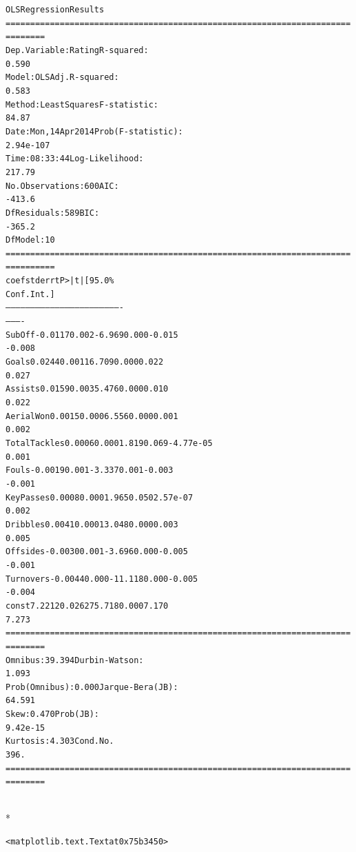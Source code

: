 \documentclass[letterpaper,10pt,english]{/usr/local/lib/python2.7/dist-packages/sphinx/texinputs/sphinxhowto}
\def\smaller{\fontsize{9.5pt}{9.5pt}\selectfont}
\newenvironment{InvisibleVerbatim}
        {\begin{mdframed}[leftmargin=0.1\linewidth,innerleftmargin=3pt,innerrightmargin=3pt, userdefinedwidth=1\linewidth, linewidth=0pt, linecolor=white, usetwoside=false]}
        {\end{mdframed}}
\begin{document}
                \begin{InvisibleVerbatim}
                \vspace{-0.5\baselineskip}
\begin{alltt}                            OLS Regression Results
======================================================================
========
Dep. Variable:                 Rating   R-squared:
0.590
Model:                            OLS   Adj. R-squared:
0.583
Method:                 Least Squares   F-statistic:
84.87
Date:                Mon, 14 Apr 2014   Prob (F-statistic):
2.94e-107
Time:                        08:33:44   Log-Likelihood:
217.79
No. Observations:                 600   AIC:
-413.6
Df Residuals:                     589   BIC:
-365.2
Df Model:                          10
======================================================================
==========
                   coef    std err          t      P>|t|      [95.0\%
Conf. Int.]
----------------------------------------------------------------------
----------
SubOff          -0.0117      0.002     -6.969      0.000        -0.015
-0.008
Goals            0.0244      0.001     16.709      0.000         0.022
0.027
Assists          0.0159      0.003      5.476      0.000         0.010
0.022
AerialWon        0.0015      0.000      6.556      0.000         0.001
0.002
TotalTackles     0.0006      0.000      1.819      0.069     -4.77e-05
0.001
Fouls           -0.0019      0.001     -3.337      0.001        -0.003
-0.001
KeyPasses        0.0008      0.000      1.965      0.050      2.57e-07
0.002
Dribbles         0.0041      0.000     13.048      0.000         0.003
0.005
Offsides        -0.0030      0.001     -3.696      0.000        -0.005
-0.001
Turnovers       -0.0044      0.000    -11.118      0.000        -0.005
-0.004
const            7.2212      0.026    275.718      0.000         7.170
7.273
======================================================================
========
Omnibus:                       39.394   Durbin-Watson:
1.093
Prob(Omnibus):                  0.000   Jarque-Bera (JB):
64.591
Skew:                           0.470   Prob(JB):
9.42e-15
Kurtosis:                       4.303   Cond. No.
396.
======================================================================
========
\end{alltt}

            \end{InvisibleVerbatim}
            
                \makebox[0.1\linewidth]{\smaller\hfill\tt\color{nbframe-out-prompt}Out\hspace{4pt}{[}27{]}:\hspace{4pt}}\\*
                \vspace{-2.55\baselineskip}\begin{InvisibleVerbatim}
                \vspace{-0.5\baselineskip}
\begin{alltt}<matplotlib.text.Text at 0x75b3450>\end{alltt}

            \end{InvisibleVerbatim}
            
\end{document}
